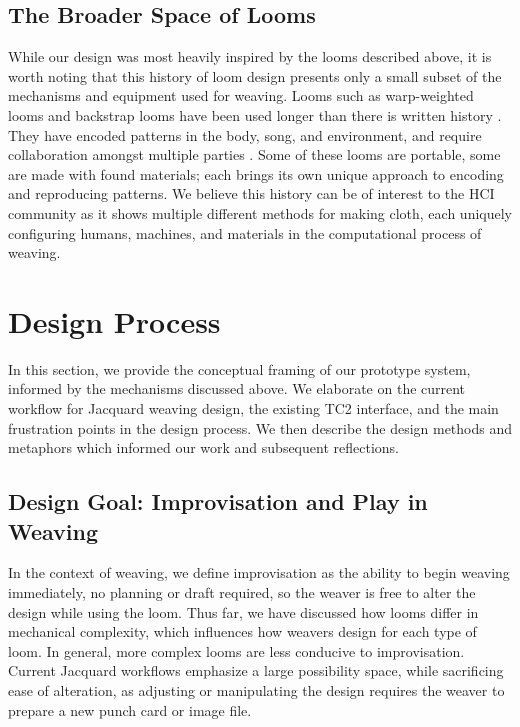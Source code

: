 \subsection{The Broader Space of Looms}

While our design was most heavily inspired by the looms described above, it is worth noting that this history of loom design presents only a small subset of the mechanisms and equipment used for weaving. Looms such as warp-weighted looms and backstrap looms have been used longer than there is written history \cite{pritchard_crafting_2022, postrel_fabric_2020}. They have encoded patterns in the body, song, and environment, and require collaboration amongst multiple parties \cite{tuck_singing_2006, rebay-salisbury_knowledge_2014}. Some of these looms are portable, some are made with found materials; each brings its own unique approach to encoding and reproducing patterns. We believe this history can be of interest to the HCI community as it shows multiple different methods for making cloth, each uniquely configuring humans, machines, and materials in the computational process of weaving. 

\section{Design Process}

In this section, we provide the conceptual framing of our prototype system, informed by the mechanisms discussed above. We elaborate on the current workflow for Jacquard weaving design, the existing TC2 interface, and the main frustration points in the design process. We then describe the design methods and metaphors which informed our work and subsequent reflections.

\subsection{Design Goal: Improvisation and Play in Weaving}

In the context of weaving, we define improvisation as the ability to begin weaving immediately, no planning or draft required, so the weaver is free to alter the design while using the loom. Thus far, we have discussed how looms differ in mechanical complexity, which influences how weavers design for each type of loom. In general, more complex looms are less conducive to improvisation. Current Jacquard workflows emphasize a large possibility space, while sacrificing ease of alteration, as adjusting or manipulating the design requires the weaver to prepare a new punch card or image file. 

